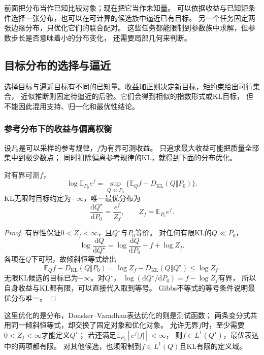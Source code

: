 前面把分布当作已知比较对象；现在把它当作未知量。
可以依据收益与已知矩条件选择一张分布，也可以在可计算的候选族中逼近已有目标。
另一个任务固定两张边缘分布，只优化它们的联合配对。
这些任务都能限制到参数族中求解，但参数步长是否意味着小的分布变化，
还需要局部几何来判断。

\subsection{目标分布的选择与逼近}
\label{sec:information-target-distribution}

选择目标与逼近目标有不同的已知量。收益加正则决定新目标，矩约束给出可行集合，
近似推断则固定待逼近的后验。它们会得到相似的指数形式或KL目标，
但不能因此混用支持、归一化和最优性结论。

\subsubsection{参考分布下的收益与偏离权衡}
\label{sec:information-gibbs-optimization}

设\(P_0\)是可以采样的参考规律，\(f\)为有界可测收益。
只追求最大收益可能把质量全部集中到极少数点；
同时扣除偏离参考规律的KL，就得到下面的分布优化。
\begin{theorem}[Gibbs变分式]
\label{thm:information-gibbs-variational}
对有界可测\(f\)，
\begin{equation}
  \log\mathbb E_{P_0}e^f
  =\sup_{Q\ll P_0}\{\mathbb E_Qf-D_{\mathrm{KL}}(Q\Vert P_0)\}.
  \label{eq:information-gibbs-variational}
\end{equation}
KL无限时目标约定为\(-\infty\)，唯一最优分布为
\[
  \frac{\mathrm dQ^\star}{\mathrm dP_0}
  =\frac{e^f}{Z_f},\qquad Z_f=\mathbb E_{P_0}e^f.
\]
\end{theorem}
\begin{proof}
有界性保证\(0<Z_f<\infty\)，且\(Q^\star\)与\(P_0\)等价。
对任何有限KL的\(Q\ll P_0\)，
\[
  \log\frac{\mathrm dQ}{\mathrm dQ^\star}
  =\log\frac{\mathrm dQ}{\mathrm dP_0}-f+\log Z_f.
\]
各项在\(Q\)下可积，故倾斜恒等式给出
\[
  \mathbb E_Qf-D_{\mathrm{KL}}(Q\Vert P_0)
  =\log Z_f-D_{\mathrm{KL}}(Q\Vert Q^\star)\leq\log Z_f.
\]
无限KL候选的目标已为\(-\infty\)。对\(Q^\star\)，
\(\log(\mathrm dQ^\star/\mathrm dP_0)=f-\log Z_f\)有界，
所以自身收益与KL都有限，可以直接代入取到等号。
Gibbs不等式的等号条件说明最优分布唯一。
\end{proof}

这里优化的是分布，Donsker--Varadhan表达优化的则是测试函数；
两条变分式共用同一倾斜恒等式，却交换了固定对象和优化对象。
允许无界\(f\)时，至少需要\(0<Z_f<\infty\)才能定义\(Q^\star\)；
若还满足\(\mathbb E_{P_0}[e^f|f|]<\infty\)，
则\(f\in L^1(Q^\star)\)，最优表达中的两项都有限。
对其他候选，也须限制到\(f\in L^1(Q)\)且KL有限的定义域。

